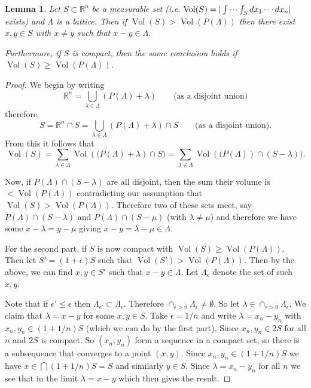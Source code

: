\documentclass[11pt,a4paper]{report}
\theoremstyle{plain}
\newtheorem{lem}[subsection]{Lemma}
\theoremstyle{definition}
\theoremstyle{definition}
\newcommand{\RR}{\mathbb{R}}
\def \e {\epsilon}
\def \lam {\lambda}
\DeclareMathOperator{\Vol}{Vol}
\begin{document}
\begin{lem}\label{lem: subset of Rn diff lem}
	Let $S \subset \RR^n$ be a measurable set (i.e. $\Vol(S)=|\idotsint_S dx_1\cdots dx_n|$ exists) and $\Lambda$ is a lattice. Then if\/ $\Vol(S) > \Vol(P(\Lambda))$ then there exist $x,y \in S$ with $x \neq y$ such that $x-y \in \Lambda$.
	
	Furthermore, if $S$ is compact, then the same conclusion holds if $\Vol(S) \geq \Vol(P(\Lambda))$.
\end{lem}

\begin{proof}
	We begin by writing \[\RR^n = \bigcup_{\lam \in \Lambda}  \left (P(\Lambda)+\lam \right )\qquad \text{(as a disjoint union)}\] therefore \[S= \RR^n \cap S= \bigcup_{\lam \in \Lambda}  \left (P(\Lambda)+\lam \right ) \cap S \qquad \text{(as a disjoint union)}. \] From this it follows that \[\Vol(S)=\sum_{\lam \in \Lambda}  \Vol \left ((P(\Lambda)+\lam \right ) \cap S) =\sum_{\lam \in \Lambda}  \Vol  \left ((P(\Lambda) \right ) \cap (S-\lam) ).  \]
	
	Now, if $P(\Lambda) \cap (S -\lam)$ are all disjoint, then the sum their volume is $< \Vol(P(\Lambda))$ contradicting  our assumption that $\Vol(S)> \Vol(P(\Lambda))$. Therefore two of these sets meet, say $P(\Lambda) \cap (S -\lam)$ and $P(\Lambda) \cap (S -\mu)$ (with $\lam \neq \mu$) and therefore we have some $x-\lam=y-\mu$ giving $x-y=\lam-\mu \in \Lambda$.
	
	
	For the second part, if $S$ is now compact with $\Vol(S) \geq \Vol(P(\Lambda))$. Then let $S'=(1+\e)S$ such that $\Vol(S')> \Vol(P(\Lambda))$. Then by the above, we can find $x,y \in S'$ such that $x-y \in \Lambda$. Let $\Lambda_\e$ denote the set of such $x,y$.
	
	Note that if $\e' \leq \e$ then $\Lambda_{\e'} \subset \Lambda_\e$. Therefore $\cap_{\e>0} \Lambda_\e \neq \emptyset$. So let $\lam \in \cap_{\e>0} \Lambda_\e$. We claim that $\lam=x-y$ for some $x,y \in S$. Take $\e=1/n$ and write $\lam=x_n-y_n$ with $x_n,y_n \in (1+1/n)S$ (which we can do by the first part). Since $x_n,y_n \in 2S$ for all $n$ and $2S$ is compact. So $(x_n,y_n)$ form a sequence in a compact set, so there is a subsequence that converges to a point $(x,y)$. Since $x_n,y_n \in (1+1/n)S$ we have $x \in \bigcap(1+1/n)S=S$ and similarly $y \in S$. Since $\lam=x_n-y_n$ for all $n$ we see that in the limit $\lam=x-y$ which then gives the result.
	
\end{proof}
\end{document}
